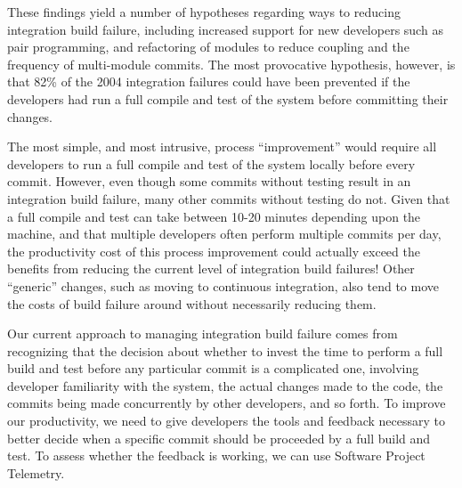 \documentclass[11pt,twocolumn]{article}
\begin{document}
These findings yield a number of hypotheses regarding ways to reducing
integration build failure, including increased support for new developers
such as pair programming, and refactoring of modules to reduce coupling and
the frequency of multi-module commits. The most provocative hypothesis,
however, is that 82\% of the 2004 integration failures could have been
prevented if the developers had run a full compile and test of the system
before committing their changes.  

The most simple, and most intrusive, process ``improvement'' would require
all developers to run a full compile and test of the system locally before
every commit. However, even though some commits without testing result in
an integration build failure, many other commits without testing do not.
Given that a full compile and test can take between 10-20 minutes depending
upon the machine, and that multiple developers often perform multiple
commits per day, the productivity cost of this process improvement could
actually exceed the benefits from reducing the current level of integration
build failures! Other ``generic'' changes, such as moving to continuous
integration, also tend to move the costs of build failure around without
necessarily reducing them.

Our current approach to managing integration build failure comes from
recognizing that the decision about whether to invest the time to perform a
full build and test before any particular commit is a complicated one,
involving developer familiarity with the system, the actual changes made to
the code, the commits being made concurrently by other developers, and so
forth.  To improve our productivity, we need to give developers the tools
and feedback necessary to better decide when a specific commit should be
proceeded by a full build and test.  To assess whether the feedback is
working, we can use Software Project Telemetry. 
\end{document}
